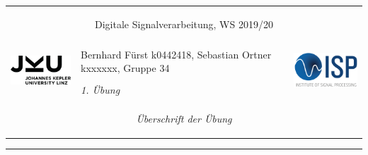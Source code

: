 \documentclass[12pt,a4paper,austrian]{article}
\begin{document}
\pagestyle{plain}
  \thispagestyle{empty}
  \noindent
  \begin{minipage}[b][2.4cm]{1.0\textwidth}  
  \begin{tabular}{l p{11cm} r} 
    \multicolumn{3}{c}{\centering \begin{large}\begin{bf}
  	\textsf{Digitale Signalverarbeitung, WS 2019/20} \end{bf}\end{large} }  
  	 \\
  	\multirow{2}{*}{\includegraphics[height=1.6cm]{fig/JKU_Logo}} 
  	& \centering Bernhard Fürst k0442418, Sebastian Ortner kxxxxxx, Gruppe 34 \vspace{1.3em}  &
    \multirow{2}{*}{\includegraphics[height=1.9cm]{fig/ISP-Logo-color-02}}  \\	
    & \centering \textit{1. Übung} & \\     
    \multicolumn{3}{c}{\centering \begin{large}
    \textit{Überschrift der Übung}%
    \end{large} }  
 
  \end{tabular} 
  \end{minipage}

  \noindent \rule[0.8em]{\textwidth}{0.12mm}\\[-0.5em]

\end{document}
